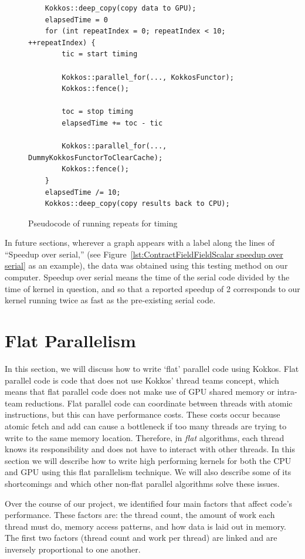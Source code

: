 \begin{figure}[ht]
\begin{lstlisting}
    Kokkos::deep_copy(copy data to GPU);
    elapsedTime = 0
    for (int repeatIndex = 0; repeatIndex < 10; ++repeatIndex) {
        tic = start timing

        Kokkos::parallel_for(..., KokkosFunctor);
        Kokkos::fence();

        toc = stop timing
        elapsedTime += toc - tic

        Kokkos::parallel_for(..., DummyKokkosFunctorToClearCache);
        Kokkos::fence();
    }
    elapsedTime /= 10;
    Kokkos::deep_copy(copy results back to CPU);
 \end{lstlisting}
\caption{Pseudocode of running repeats for timing}
\label{lst:repeats}
\end{figure}

In future sections, wherever a graph appears with a label along the lines of
``Speedup over serial,'' (see Figure~\ref{lst:ContractFieldFieldScalar speedup
over serial} as an example), the data was obtained using this testing method on
our computer. Speedup over serial means the time of the serial code divided by
the time of kernel in question, and so that a reported speedup of 2 corresponds
to our kernel running twice as fast as the pre-existing serial code.


\section{Flat Parallelism}
In this section, we will discuss how to write `flat' parallel code using Kokkos.
Flat parallel code is code that does not use Kokkos' thread teams concept, which
means that flat parallel code does not make use of GPU shared memory or
intra-team reductions.  Flat parallel code can coordinate between threads with atomic
instructions, but this can have performance costs. These costs occur because
atomic fetch and add can cause a bottleneck if too many threads are trying to
write to the same memory location. Therefore, in \emph{flat} algorithms, each
thread knows its responsibility and does not have to interact with other
threads. In this section we will describe how to write high performing kernels
for both the CPU and GPU using this flat parallelism technique. We will also
describe some of its shortcomings and which other non-flat parallel algorithms
solve these issues.

Over the course of our project, we identified four main factors that affect
code's performance. These factors are: the thread count, the amount of work each
thread must do, memory access patterns, and how data is laid out in memory.  The
first two factors (thread count and work per thread) are linked and are
inversely proportional to one another. 

